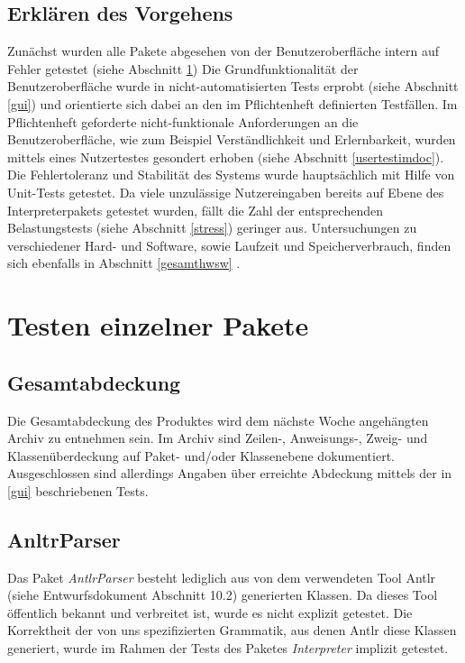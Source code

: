 \documentclass[parskip=full]{scrartcl}
\begin{document}
\subsection{Erklären des Vorgehens}
Zunächst wurden alle Pakete abgesehen von der Benutzeroberfläche intern auf Fehler getestet (siehe Abschnitt \ref{einzelnePakete})
Die Grundfunktionalität der Benutzeroberfläche wurde in nicht-automatisierten Tests erprobt (siehe Abschnitt \ref{gui}) und orientierte sich dabei an den im Pflichtenheft definierten Testfällen. Im Pflichtenheft geforderte nicht-funktionale Anforderungen an die Benutzeroberfläche, wie zum Beispiel Verständlichkeit und Erlernbarkeit, wurden mittels eines Nutzertestes gesondert erhoben (siehe Abschnitt \ref{usertestimdoc}).
Die Fehlertoleranz und Stabilität des Systems wurde hauptsächlich mit Hilfe von Unit-Tests getestet. Da viele unzulässige Nutzereingaben bereits auf Ebene des Interpreterpakets getestet wurden, fällt die Zahl der entsprechenden Belastungstests (siehe Abschnitt \ref{stress}) geringer aus. Untersuchungen zu verschiedener Hard- und Software, sowie Laufzeit und Speicherverbrauch, finden sich ebenfalls in Abschnitt \ref{gesamthwsw} .

\newpage
\section{Testen einzelner Pakete}\label{einzelnePakete}

\subsection{Gesamtabdeckung}\label{abdeckung}
Die Gesamtabdeckung des Produktes wird dem nächste Woche angehängten Archiv zu entnehmen sein.
Im Archiv sind Zeilen-, Anweisungs-, Zweig- und Klassenüberdeckung auf Paket- und/oder Klassenebene dokumentiert.
Ausgeschlossen sind allerdings Angaben über erreichte Abdeckung mittels der in \ref{gui} beschriebenen Tests.
\subsection{AnltrParser}
Das Paket \textit{AntlrParser} besteht lediglich aus von dem verwendeten Tool Antlr (siehe Entwurfsdokument Abschnitt 10.2) generierten Klassen. Da dieses Tool öffentlich bekannt und verbreitet ist, wurde es nicht explizit getestet. Die Korrektheit der von uns spezifizierten Grammatik, aus denen Antlr diese Klassen generiert, wurde im Rahmen der Tests des Paketes \textit{Interpreter} implizit getestet.
\end{document}
